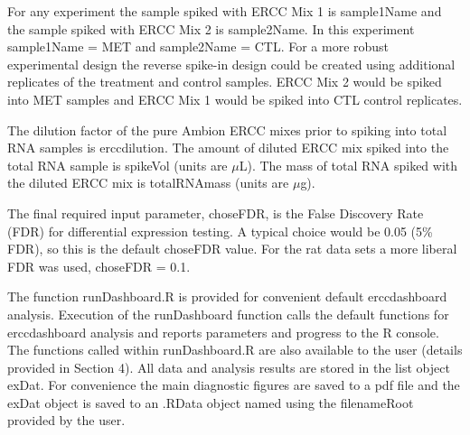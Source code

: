 \documentclass{article}
\begin{document}
For any experiment the sample spiked with ERCC Mix 1 is sample1Name and the 
sample spiked with ERCC Mix 2 is sample2Name. In this experiment 
sample1Name = MET and sample2Name = CTL. For a more robust experimental design 
the reverse spike-in design could be created using additional replicates of the
treatment and control samples. ERCC Mix 2 would be spiked into MET samples and 
ERCC Mix 1 would be spiked into CTL control replicates. 

The dilution factor of the pure Ambion ERCC mixes prior to spiking into total 
RNA samples is erccdilution. The amount of diluted ERCC mix spiked into
the total RNA sample is spikeVol (units are $\mu$L). The mass of total RNA 
spiked with the diluted ERCC mix is totalRNAmass (units are $\mu$g).

The final required input parameter, choseFDR, is the False Discovery Rate (FDR) 
for differential expression testing. A typical choice would be 0.05 (5\% FDR), 
so this is the default choseFDR value. For the rat data sets a more liberal FDR 
was used, choseFDR = 0.1.

The function runDashboard.R is provided for convenient default erccdashboard 
analysis. Execution of the runDashboard function calls the default functions for
erccdashboard analysis and reports parameters and progress to the R console. The
functions called within runDashboard.R are also available to the user (details 
provided in Section 4). 
All data and analysis results are stored in the list object exDat. For convenience 
the main diagnostic figures are saved to a pdf file and the exDat object is 
saved to an .RData object named using the filenameRoot provided by the user.
\end{document}
